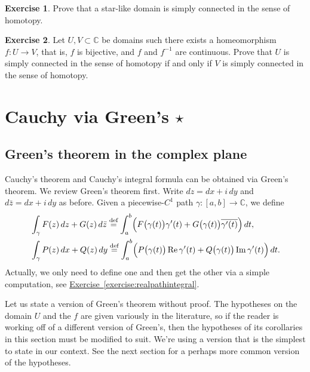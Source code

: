 \documentclass[12pt,openany]{book}
\renewcommand{\Re}{\operatorname{Re}}
\renewcommand{\Im}{\operatorname{Im}}
\newcommand{\C}{{\mathbb{C}}}
\theoremstyle{plain}
\theoremstyle{remark}
\theoremstyle{definition}
\newenvironment{exbox}{%
    \def\FrameCommand{\vrule width 1pt \relax\hspace{10pt}}%
    \MakeFramed{\advance\hsize-\width\FrameRestore}%
}{%
    \endMakeFramed
}
\theoremstyle{exercise}
\newtheorem{exercise}{Exercise}[section]
\theoremstyle{example}
\newcommand{\exerciseref}[1]{\hyperref[#1]{Exercise~\ref*{#1}}}
\begin{document}
\begin{exbox}
\begin{exercise}
Prove that a star-like domain is simply connected in the sense of homotopy.
\end{exercise}

\begin{exercise}
Let $U,V \subset \C$ be domains such 
there exists a homeomorphism
$f \colon U \to V$, that is, $f$ is bijective, and $f$ and $f^{-1}$ are
continuous.  Prove that $U$ is simply connected in the sense of homotopy if
and only if $V$ is simply connected in the sense of homotopy.
\end{exercise}
\end{exbox}


\section{Cauchy via Green's \texorpdfstring{$\star$}{*}}

\subsection{Green's theorem in the complex plane}

Cauchy's theorem and Cauchy's integral formula can be obtained via 
Green's theorem.
We review Green's theorem first.
Write $dz = dx + i\, dy$ and $d\bar{z} = dx + i \, dy$ as before.
Given a piecewise-$C^1$ path $\gamma \colon [a,b] \to \C$, we define
\begin{align*}
& \int_\gamma
F(z) \, dz + G(z) \, d\bar{z}
\overset{\text{def}}{=}
\int_a^b 
\Bigl(F\bigl(\gamma(t)\bigr) \gamma'(t) + G\bigl(\gamma(t)\bigr)
\overline{\gamma'(t)} \Bigr) \, dt ,
\\
& \int_\gamma
P(z) \, dx + Q(z) \, dy
\overset{\text{def}}{=}
\int_a^b 
\Bigl(P\bigl(\gamma(t)\bigr) \Re \gamma'(t) + Q\bigl(\gamma(t)\bigr) \Im
\gamma'(t) \Bigr) \, dt .
\end{align*}
Actually, we only need to define one and then get the other via a simple
computation, see \exerciseref{exercise:realpathintegral}.

Let us state a version of Green's theorem without proof.
The hypotheses on the domain $U$ and the $f$ are given variously in the literature,
so if the reader is working off of a different version of Green's, then the
hypotheses of its corollaries in this section must be modified to suit.
We're using a version that is the simplest to state in our context.
See the next section for a perhaps more common version of the hypotheses.
\end{document}
